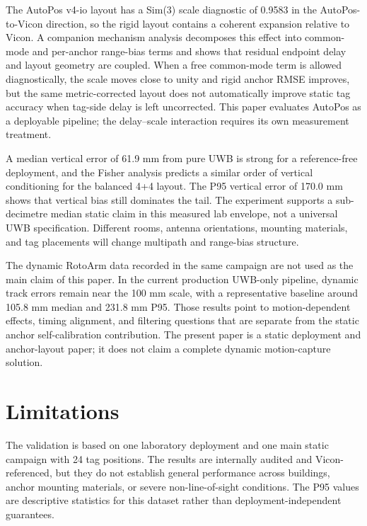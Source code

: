 \documentclass[journal,twoside,web]{ieeecolor}
\begin{document}
The AutoPos v4-io layout has a Sim(3) scale diagnostic of 0.9583 in the AutoPos-to-Vicon direction, so the rigid layout contains a coherent expansion relative to Vicon. A companion mechanism analysis decomposes this effect into common-mode and per-anchor range-bias terms and shows that residual endpoint delay and layout geometry are coupled. When a free common-mode term is allowed diagnostically, the scale moves close to unity and rigid anchor RMSE improves, but the same metric-corrected layout does not automatically improve static tag accuracy when tag-side delay is left uncorrected. This paper evaluates AutoPos as a deployable pipeline; the delay--scale interaction requires its own measurement treatment.

A median vertical error of 61.9 mm from pure UWB is strong for a reference-free deployment, and the Fisher analysis predicts a similar order of vertical conditioning for the balanced 4+4 layout. The P95 vertical error of 170.0 mm shows that vertical bias still dominates the tail. The experiment supports a sub-decimetre median static claim in this measured lab envelope, not a universal UWB specification. Different rooms, antenna orientations, mounting materials, and tag placements will change multipath and range-bias structure.

The dynamic RotoArm data recorded in the same campaign are not used as the main claim of this paper. In the current production UWB-only pipeline, dynamic track errors remain near the 100 mm scale, with a representative baseline around 105.8 mm median and 231.8 mm P95. Those results point to motion-dependent effects, timing alignment, and filtering questions that are separate from the static anchor self-calibration contribution. The present paper is a static deployment and anchor-layout paper; it does not claim a complete dynamic motion-capture solution.

\section{Limitations}
\label{sec:limitations}

The validation is based on one laboratory deployment and one main static campaign with 24 tag positions. The results are internally audited and Vicon-referenced, but they do not establish general performance across buildings, anchor mounting materials, or severe non-line-of-sight conditions. The P95 values are descriptive statistics for this dataset rather than deployment-independent guarantees.
\end{document}
